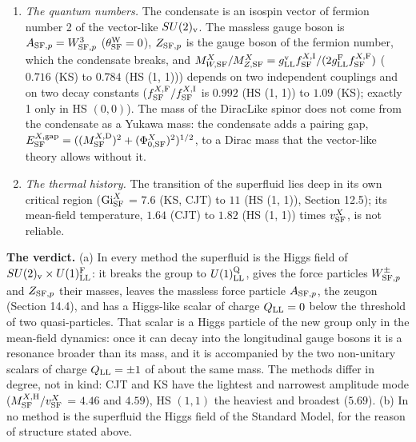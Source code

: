 \documentclass[
  10pt,
]{article}
\begin{document}
\begin{enumerate}
  \(1.09\) (KS) times \(M^{X,{\rm H}}_{\rm SF}\) (degenerate with the
  amplitude mode in HS \((0,1)\) and HS \((0,0)\)); with the amplitude
  mode they are the three massive scalar fields of the count of Section
  14.2.
\item
  \emph{The quantum numbers.} The condensate is an isospin vector of
  fermion number 2 of the vector-like \(SU(2)_{\rm v}\). The massless
  gauge boson is \(A_{{\rm SF},p}=W^3_{{\rm SF},p}\)
  (\(\theta^{\rm W}_{\rm SF}=0\)), \(Z_{{\rm SF},p}\) is the gauge boson
  of the fermion number, which the condensate breaks, and
  \(M^X_{W,{\rm SF}}/M^X_{Z,{\rm SF}}=g^{\rm v}_{\rm LL}f^{X,{\rm I}}_{\rm SF}/(2g^{\rm F}_{\rm LL}f^{X,{\rm F}}_{\rm SF})\)
  (\(0.716\) (KS) to \(0.784\) (HS (1, 1))) depends on two independent
  couplings and on two decay constants
  (\(f^{X,{\rm F}}_{\rm SF}/f^{X,{\rm I}}_{\rm SF}\) is \(0.992\) (HS
  (1, 1)) to \(1.09\) (KS); exactly 1 only in HS \((0,0)\)). The mass of
  the DiracLike spinor does not come from the condensate as a Yukawa
  mass: the condensate adds a pairing gap,
  \(E^{X,{\rm gap}}_{\rm SF}=((M^{X,{\rm D}}_{\rm SF})^2+(\Phi^X_{0,{\rm SF}})^2)^{1/2}\),
  to a Dirac mass that the vector-like theory allows without it.
\item
  \emph{The thermal history.} The transition of the superfluid lies deep
  in its own critical region (\({\rm Gi}^{X}_{\rm SF}\) = \(7.6\) (KS,
  CJT) to \(11\) (HS (1, 1)), Section 12.5); its mean-field temperature,
  \(1.64\) (CJT) to \(1.82\) (HS (1, 1)) times \(v^X_{\rm SF}\), is not
  reliable.
\end{enumerate}

\textbf{The verdict.} (a) In every method the superfluid is the Higgs
field of \(SU(2)_{\rm v}\times U(1)^{\rm F}_{\rm LL}\): it breaks the
group to \(U(1)^{\rm Q}_{\rm LL}\), gives the force particles
\(W^\pm_{{\rm SF},p}\) and \(Z_{{\rm SF},p}\) their masses, leaves the
massless force particle \(A_{{\rm SF},p}\), the zeugon (Section 14.4),
and has a Higgs-like scalar of charge \(Q_{\rm LL}=0\) below the
threshold of two quasi-particles. That scalar is a Higgs particle of the
new group only in the mean-field dynamics: once it can decay into the
longitudinal gauge bosons it is a resonance broader than its mass, and
it is accompanied by the two non-unitary scalars of charge
\(Q_{\rm LL}=\pm1\) of about the same mass. The methods differ in
degree, not in kind: CJT and KS have the lightest and narrowest
amplitude mode (\(M^{X,{\rm H}}_{\rm SF}/v^X_{\rm SF}\) = \(4.46\) and
\(4.59\)), HS \((1,1)\) the heaviest and broadest (\(5.69\)). (b) In no
method is the superfluid the Higgs field of the Standard Model, for the
reason of structure stated above.
\end{document}
